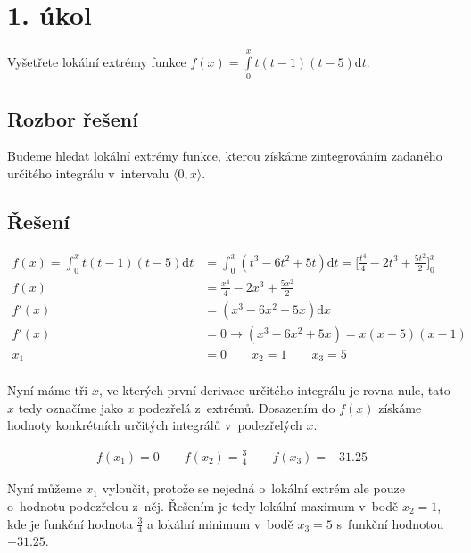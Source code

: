 \section{1. úkol}
Vyšetřete lokální extrémy funkce $f(x) = \int\limits_0^x t(t-1)(t-5)\mathrm{d}t$.

\subsection*{Rozbor řešení}
Budeme hledat lokální extrémy funkce, kterou získáme zintegrováním zadaného určitého integrálu v~intervalu $\langle 0, x \rangle$.

\subsection*{Řešení}
\begin{align*}
	f(x) = \int_0^x t(t-1)(t-5)\mathrm{d}t & = \int_0^x (t^3 - 6t^2 + 5t)\mathrm{d}t = \Big[\frac{t^4}{4} - 2t^3 + \frac{5t^2}{2}\Big]_0^x \\
	f(x) & = \frac{x^4}{4} - 2x^3 + \frac{5x^2}{2} \\
	f'(x) & = (x^3 - 6x^2 + 5x)\mathrm{d}x \\
	f'(x) & = 0  \rightarrow (x^3 - 6x^2 + 5x) = x(x - 5)(x - 1) \\
	x_1 & = 0 \qquad x_2 = 1\qquad x_3 = 5 \\
\end{align*}

Nyní máme tři $x$, ve kterých první derivace určitého integrálu je rovna nule, tato $x$ tedy označíme jako $x$ podezřelá z~extrémů. Dosazením do $f(x)$ získáme hodnoty konkrétních určitých integrálů v~podezřelých $x$.

\begin{align*}
	f(x_1) = 0 \qquad f(x_2) = \frac{3}{4} \qquad f(x_3) = -31.25
\end{align*}

Nyní můžeme $x_1$ vyloučit, protože se nejedná o~lokální extrém ale pouze o~hodnotu podezřelou z~něj. Řešením je tedy lokální maximum v~bodě $x_2 = 1$, kde je funkční hodnota $\frac{3}{4}$ a lokální minimum v~bodě $x_3 = 5$ s~funkční hodnotou $-31.25$.